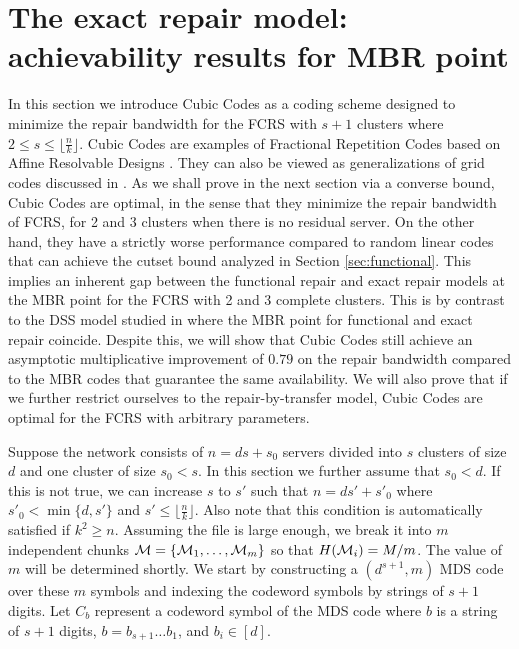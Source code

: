 \documentclass[journal,onecolumn,draftcls]{IEEEtran}
\begin{document}
\section{The exact repair model: achievability results for MBR point}
\label{sec:cubic}
In this section we introduce Cubic Codes as a coding scheme designed to minimize the repair bandwidth for the FCRS with $s+1$ clusters where $2\le s\le \lfloor\frac{n}{k}\rfloor$. Cubic Codes are examples of Fractional Repetition Codes \cite{el2010fractional} based on Affine Resolvable Designs \cite{olmez2016fractional}. They can also be viewed as generalizations of grid codes discussed in \cite{olmez2016fractional}. As we shall prove in the next section via a converse bound, Cubic Codes are optimal, in the sense that they minimize the repair bandwidth of FCRS, for 2 and 3 clusters when there is no residual server. On the other hand, they have a strictly worse performance compared to random linear codes that can achieve the cutset bound analyzed in Section \ref{sec:functional}. This implies an inherent gap between the functional repair and exact repair models at the MBR point for the FCRS with 2 and 3 complete clusters. This is by contrast to the DSS model studied in \cite{dimakis2010network} where the MBR point for functional and exact repair coincide. Despite this, we will show that Cubic Codes still achieve an asymptotic multiplicative improvement of $0.79$ on the repair bandwidth compared to the MBR codes \cite{rashmi2009explicit} that guarantee the same availability. We will also prove that if we further restrict ourselves to the repair-by-transfer model, Cubic Codes are optimal for the FCRS with arbitrary parameters.

Suppose the network consists of $n = ds + s_0$ servers divided into $s$ clusters of size $d$ and one cluster of size $s_0 < s$. In this section we further assume that $s_0 < d$. If this is  not true, we can increase $s$ to $s'$ such that $n = ds' + s'_0$ where $s'_0 < \min\{d,s'\}$ and $s'\le \lfloor\frac{n}{k}\rfloor$. Also note that this condition is automatically satisfied if $k^2\ge n$. Assuming the file is large enough, we break it into $m$ independent chunks ${\cal M} = \{{\cal M}_1,\dots,{\cal M}_m\}$ so that $H({\cal M}_i) = M/m$. The value of $m$ will be determined shortly. We start by constructing a $(d^{s+1},m)$ MDS code over these $m$ symbols and indexing the codeword symbols by strings of $s+1$ digits. Let $C_b$ represent a codeword symbol of the MDS code where $b$ is a string of $s+1$ digits, $b = b_{s+1}\dots b_1$, and $b_i\in[d]$.
\end{document}
